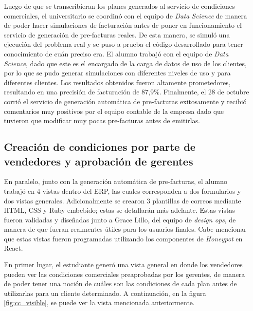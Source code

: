     Luego de que se transcribieran los planes generados al servicio de condiciones comerciales, el universitario se coordinó con el equipo de \textit{Data Science} de manera de poder hacer simulaciones de facturación antes de poner en funcionamiento el servicio de generación de pre-facturas reales. De esta manera, se simuló una ejecución del problema real y se puso a prueba el código desarrollado para tener conocimiento de cuán preciso era. El alumno trabajó con el equipo de \textit{Data Science}, dado que este es el encargado de la carga de datos de uso de los clientes, por lo que se pudo generar simulaciones con diferentes niveles de uso y para diferentes clientes. Los resultados obtenidos fueron altamente prometedores, resultando en una precisión de facturación de 87,9\%. Finalmente, el 28 de octubre corrió el servicio de generación automática de pre-facturas exitosamente y recibió comentarios muy positivos por el equipo contable de la empresa dado que tuvieron que modificar muy pocas pre-facturas antes de emitirlas.

  \subsection{Creación de condiciones por parte de vendedores y aprobación de gerentes}
    \label{vistas_cc}

    En paralelo, junto con la generación automática de pre-facturas, el alumno trabajó en 4 vistas dentro del ERP, las cuales corresponden a dos formularios y dos vistas generales. Adicionalmente se crearon 3 plantillas de correos mediante HTML, CSS y Ruby embebido; estas se detallarán más adelante. Estas vistas fueron validadas y diseñadas junto a Grace Lillo, del equipo de \textit{design ops}, de manera de que fueran realmentes útiles para los usuarios finales. Cabe mencionar que estas vistas fueron programadas utilizando los componentes de \textit{Honeypot} en React. 
    
    En primer lugar, el estudiante generó una vista general en donde los vendedores pueden ver las condiciones comerciales preaprobadas por los gerentes, de manera de poder tener una noción de cuáles son las condiciones de cada plan antes de utilizarlas para un cliente determinado. A continuación, en la figura \ref{fig:cc_visible}, se puede ver la vista mencionada anteriormente.


